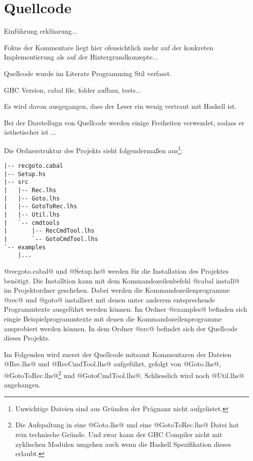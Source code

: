 \documentclass[
    a4paper,
    oneside,
    parskip=half,
    toc=listof,
    bibliography=totoc,
    listof=totoc,
]{scrbook}
\newenvironment{myindent}[1]%
 {\begin{list}{}%
         {\setlength{\leftmargin}{#1}}%
         \item[]%
 }
 {\end{list}}
\begin{document}
\chapter{Quellcode}

Einführung erklüarung...

Fokus der Kommentare liegt hier ofensichtlich mehr auf der konkreten
Implementierung als auf der Hintergrundkonzepte...

Quellcode wurde im Literate Programming Stil verfasst.

GHC Version, cabal file, folder aufbau, tests...

Es wird davon ausgegangen, dass der Leser ein wenig vertraut mit Haskell ist.

Bei der Darstellugn von Quellcode werden einige Freiheiten verwendet, sodass er
ästhetischer ist ...

Die Ordnerstruktur des Projekts sieht folgendermaßen aus\footnote{Unwichtige
Dateien sind aus Gründen der Prägnanz nicht aufgelistet.}:
%
\begin{myindent}{3mm}
\begin{verbatim}
|-- recgoto.cabal
|-- Setup.hs
|-- src
|   |-- Rec.lhs
|   |-- Goto.lhs
|   |-- GotoToRec.lhs
|   |-- Util.lhs
|   `-- cmdtools
|       |-- RecCmdTool.lhs
|       `-- GotoCmdTool.lhs
`-- examples
    |...
\end{verbatim}
\end{myindent}
%
@recgoto.cabal@ und @Setup.hs@ werden für die Installation des Projektes
benötigt. Die Installtion kann mit dem Kommandozeilenbefehl @cabal install@ im
Projektordner geschehen. Dabei werden die Kommandozeilenprogramme @rec@ und
@goto@ installiert mit denen unter anderem entsprechende Programmtexte
ausgeführt werden können. Im Ordner @examples@ befinden sich eingie
Beispielprogrammtexte mit denen die Kommandozeilenprogramme ausprobiert werden
können.  In dem Ordner @src@ befindet
sich der Quellcode dieses Projekts.

Im Folgenden wird zuerst der Quellcode mitsamt Kommentaren der Dateien
@Rec.lhs@ und @RecCmdTool.lhs@ aufgeführt, gefolgt von @Goto.lhs@,
@GotoToRec.lhs@\footnote{Die Aufspaltung in eine @Goto.lhs@ und eine
@GotoToRec.lhs@ Datei hat rein technische Gründe. Und zwar kann der GHC
Compiler nicht mit zyklischen Modulen umgehen auch wenn die Haskell
Spezifikation dieses erlaubt.} und @GotoCmdTool.lhs@. Schliesslich wird noch
@Util.lhs@ angehangen.






\end{document}

